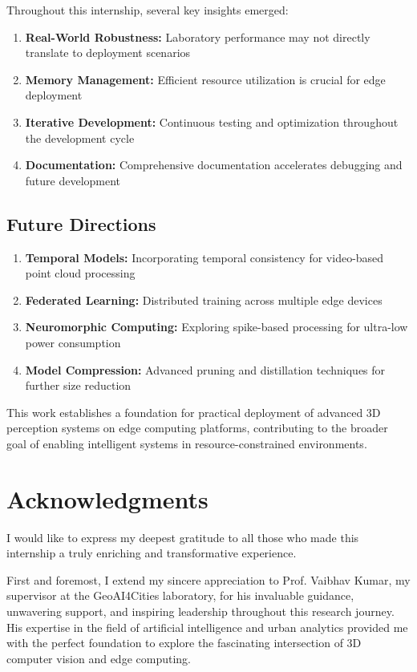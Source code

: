 \documentclass[12pt,a4paper]{report}
\begin{document}
Throughout this internship, several key insights emerged:

\begin{enumerate}
    \item \textbf{Real-World Robustness:} Laboratory performance may not directly translate to deployment scenarios
    \item \textbf{Memory Management:} Efficient resource utilization is crucial for edge deployment
    \item \textbf{Iterative Development:} Continuous testing and optimization throughout the development cycle
    \item \textbf{Documentation:} Comprehensive documentation accelerates debugging and future development
\end{enumerate}

\section{Future Directions}

\begin{enumerate}
    \item \textbf{Temporal Models:} Incorporating temporal consistency for video-based point cloud processing
    \item \textbf{Federated Learning:} Distributed training across multiple edge devices
    \item \textbf{Neuromorphic Computing:} Exploring spike-based processing for ultra-low power consumption
    \item \textbf{Model Compression:} Advanced pruning and distillation techniques for further size reduction
\end{enumerate}

This work establishes a foundation for practical deployment of advanced 3D perception systems on edge computing platforms, contributing to the broader goal of enabling intelligent systems in resource-constrained environments.

\chapter*{Acknowledgments}

I would like to express my deepest gratitude to all those who made this internship a truly enriching and transformative experience. 

First and foremost, I extend my sincere appreciation to Prof. Vaibhav Kumar, my supervisor at the GeoAI4Cities laboratory, for his invaluable guidance, unwavering support, and inspiring leadership throughout this research journey. His expertise in the field of artificial intelligence and urban analytics provided me with the perfect foundation to explore the fascinating intersection of 3D computer vision and edge computing.
\end{document}
